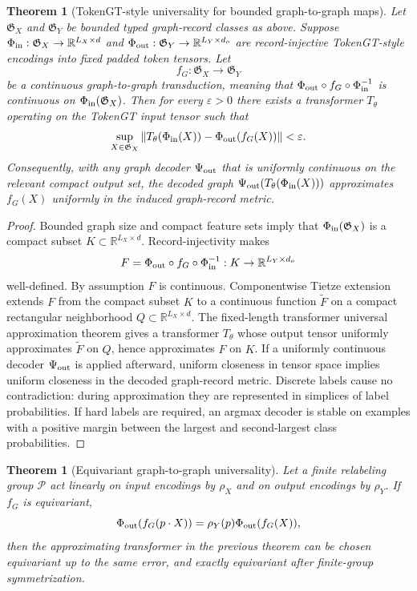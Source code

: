\documentclass[11pt]{article}
\newtheorem{theorem}[definition]{Theorem}
\newcommand{\R}{\mathbb{R}}
\newcommand{\1}{\mathbf{1}}
\newcommand{\eps}{\varepsilon}
\begin{document}
\begin{theorem}[TokenGT-style universality for bounded graph-to-graph maps]
Let \(\mathfrak G_X\) and \(\mathfrak G_Y\) be bounded typed graph-record classes as above. Suppose \(\Phi_{\rm in}:\mathfrak G_X\to\R^{L_X\times d}\) and \(\Phi_{\rm out}:\mathfrak G_Y\to\R^{L_Y\times d_o}\) are record-injective TokenGT-style encodings into fixed padded token tensors. Let
\[
  f_G:\mathfrak G_X\to\mathfrak G_Y
\]
be a continuous graph-to-graph transduction, meaning that \(\Phi_{\rm out}\circ f_G\circ\Phi_{\rm in}^{-1}\) is continuous on \(\Phi_{\rm in}(\mathfrak G_X)\). Then for every \(\eps>0\) there exists a transformer \(T_\theta\) operating on the TokenGT input tensor such that
\[
  \sup_{X\in\mathfrak G_X}
  \left\|T_\theta(\Phi_{\rm in}(X))-\Phi_{\rm out}(f_G(X))\right\| < \eps .
\]
Consequently, with any graph decoder \(\Psi_{\rm out}\) that is uniformly continuous on the relevant compact output set, the decoded graph \(\Psi_{\rm out}(T_\theta(\Phi_{\rm in}(X)))\) approximates \(f_G(X)\) uniformly in the induced graph-record metric.
\end{theorem}

\begin{proof}
Bounded graph size and compact feature sets imply that \(\Phi_{\rm in}(\mathfrak G_X)\) is a compact subset \(K\subset\R^{L_X\times d}\). Record-injectivity makes
\[
  F=\Phi_{\rm out}\circ f_G\circ\Phi_{\rm in}^{-1}:K\to\R^{L_Y\times d_o}
\]
well-defined. By assumption \(F\) is continuous. Componentwise Tietze extension extends \(F\) from the compact subset \(K\) to a continuous function \(\widetilde F\) on a compact rectangular neighborhood \(Q\subset\R^{L_X\times d}\). The fixed-length transformer universal approximation theorem gives a transformer \(T_\theta\) whose output tensor uniformly approximates \(\widetilde F\) on \(Q\), hence approximates \(F\) on \(K\). If a uniformly continuous decoder \(\Psi_{\rm out}\) is applied afterward, uniform closeness in tensor space implies uniform closeness in the decoded graph-record metric. Discrete labels cause no contradiction: during approximation they are represented in simplices of label probabilities. If hard labels are required, an argmax decoder is stable on examples with a positive margin between the largest and second-largest class probabilities.
\end{proof}

\begin{theorem}[Equivariant graph-to-graph universality]
Let a finite relabeling group \(\mathcal P\) act linearly on input encodings by \(\rho_X\) and on output encodings by \(\rho_Y\). If \(f_G\) is equivariant,
\[
  \Phi_{\rm out}(f_G(p\cdot X))=\rho_Y(p)\Phi_{\rm out}(f_G(X)),
\]
then the approximating transformer in the previous theorem can be chosen equivariant up to the same error, and exactly equivariant after finite-group symmetrization.
\end{theorem}
\end{document}
